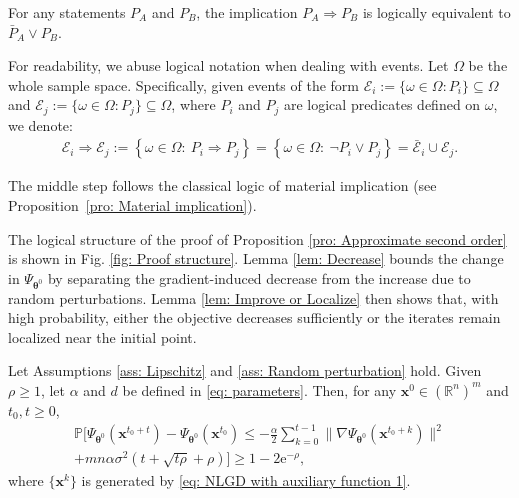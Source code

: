 \documentclass{siamart251216}
\begin{document}
    \begin{proposition}
    \label{pro: Material implication}
    For any statements $P_A$ and $P_B$, the implication $P_A\Rightarrow P_B$ is logically equivalent to $\bar{P}_A\lor P_B$.
\end{proposition}

For readability, we abuse logical notation when dealing with events. Let $\Omega$ be the whole sample space. Specifically, given events of the form $\mathcal{E}_{i} := \{\omega \in \Omega : P_{i}\} \subseteq \Omega$ and $\mathcal{E}_{j} := \{\omega \in \Omega : P_{j}\} \subseteq \Omega$, where $P_{i}$ and $P_{j}$ are logical predicates defined on $\omega$, we denote:
\begin{gather}
\label{eq: Material implication}
    \mathcal{E}_{i} \Rightarrow \mathcal{E}_{j} := \left\{ \omega \in \Omega :~P_{i} \Rightarrow P_{j} \right\} = \left\{ \omega \in \Omega :~\neg P_{i} \lor P_{j} \right\} = \bar{\mathcal{E}}_{i} \cup \mathcal{E}_{j}.
\end{gather}

The middle step follows the classical logic of material implication (see Proposition~\ref{pro: Material implication}).

The logical structure of the proof of Proposition \ref{pro: Approximate second order} is shown in Fig. \ref{fig: Proof structure}. Lemma \ref{lem: Decrease} bounds the change in $\Psi_{\boldsymbol{\theta}^{0}}$ by separating the gradient-induced decrease from the increase due to random perturbations. Lemma \ref{lem: Improve or Localize} then shows that, with high probability, either the objective decreases sufficiently or the iterates remain localized near the initial point.

\begin{lemma}
\label{lem: Decrease}
    Let Assumptions \ref{ass: Lipschitz} and \ref{ass: Random perturbation} hold. Given $\rho\geq1$, let $\alpha$ and $d$ be defined in \eqref{eq: parameters}. Then, for any $\mathbf{x}^{0}\in(\mathbb{R}^{n})^{m}$ and $t_{0},t\geq0$,
    \begin{multline}
    \label{eq: Decomposition of the change}
    \mathbb{P}\Bigg[\Psi_{\boldsymbol{\theta}^{0}}(\mathbf{x}^{t_{0}+t})-\Psi_{\boldsymbol{\theta}^{0}}(\mathbf{x}^{t_{0}})\leq-\frac{\alpha}{2}\sum_{k=0}^{t-1}\|\nabla\Psi_{\boldsymbol{\theta}^{0}}(\mathbf{x}^{t_{0}+k})\|^{2}\\
    +mn\alpha\sigma^{2}(t+\sqrt{t\rho}+\rho)\Bigg]\geq1-2\mathrm{e}^{-\rho},
    \end{multline}
    where $\{\mathbf{x}^{k}\}$ is generated by \eqref{eq: NLGD with auxiliary function 1}.
\end{lemma}
\end{document}
